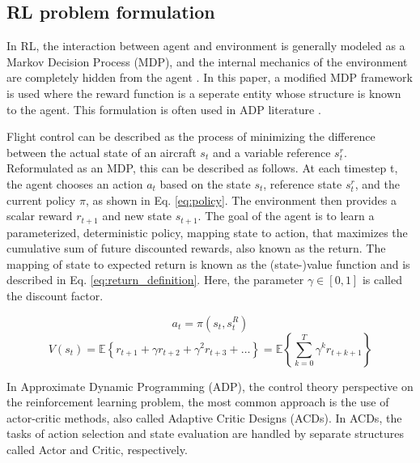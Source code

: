 

\subsection{RL problem formulation} \label{ssec:rlproblem}
In RL, the interaction between agent and environment is generally modeled as a Markov Decision Process (MDP), and the internal mechanics of the environment are completely hidden from the agent \cite{book:suttonbarto}. In this paper, a modified MDP framework is used where the reward function is a seperate entity whose structure is known to the agent. This formulation is often used in ADP literature \cite{Bertsekas2000, Enns2002, Enns2003a, Enns2003b, Ferrari2004,VanKampen2006}.  

Flight control can be described as the process of minimizing the difference between the actual state of an aircraft $s_t$ and a variable reference $s_t^{r}$. Reformulated as an MDP, this can be described as follows. At each timestep t, the agent chooses an action $a_t$ based on the state $s_t$, reference state $s_t^r$, and the current policy $\pi$, as shown in Eq. \eqref{eq:policy}. The environment then provides a scalar reward $r_{t+1}$ and new state $s_{t+1}$. The goal of the agent is to learn a parameterized, deterministic policy, mapping state to action, that maximizes the cumulative sum of future discounted rewards, also known as the return. The mapping of state to expected return is known as the (state-)value function and is described in Eq. \eqref{eq:return_definition}. Here, the parameter $\gamma \in [0,1]$ is called the discount factor.

\begin{equation} \label{eq:policy}
    a_t = \pi( s_t, s_t^R)
\end{equation}
\begin{equation} \label{eq:return_definition}
    V(s_t) = \mathbb{E} \left\{ r_{t+1} + \gamma r_{t+2} + \gamma^2 r_{t+3} + \ldots \right\} = \mathbb{E} \left\{\sum_{k=0}^T \gamma^k r_{t+k+1} \right\}
\end{equation}

In Approximate Dynamic Programming (ADP), the control theory perspective on the reinforcement learning problem, the most common approach is the use of actor-critic methods, also called Adaptive Critic Designs (ACDs). In ACDs, the tasks of action selection and state evaluation are handled by separate structures called Actor and Critic, respectively.

